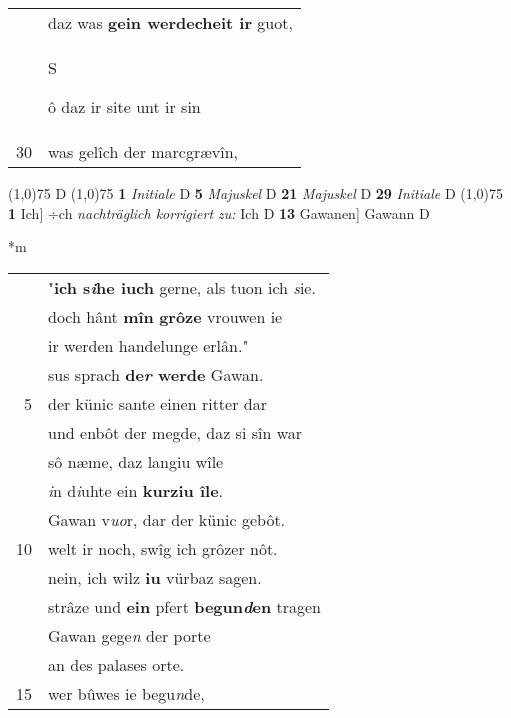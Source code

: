 \documentclass[8pt,a4paper,notitlepage]{article}
\begin{document}
\begin{table}[ht]
\begin{minipage}[t]{0.5\linewidth}
\begin{tabular}{rl}
 & daz was \textbf{gein werdecheit ir} guot,\\ 
 & \begin{large}S\end{large}ô daz ir site unt ir sin\\ 
30 & was gelîch der marcgrævîn,\\ 
\end{tabular}
\scriptsize
\line(1,0){75} \newline
D \newline
\line(1,0){75} \newline
\textbf{1} \textit{Initiale} D  \textbf{5} \textit{Majuskel} D  \textbf{21} \textit{Majuskel} D  \textbf{29} \textit{Initiale} D  \newline
\line(1,0){75} \newline
\textbf{1} Ich] ÷ch \textit{nachträglich korrigiert zu:} Ich D \textbf{13} Gawanen] Gawann D \newline
\end{minipage}
\hspace{0.5cm}
\begin{minipage}[t]{0.5\linewidth}
\small
\begin{center}*m
\end{center}
\begin{tabular}{rl}
 & "\textbf{ich s\textit{i}he iuch} gerne, als tuon ich \textit{s}ie.\\ 
 & doch hânt \textbf{mîn} \textbf{grôze} vrouwen ie\\ 
 & ir werden handelunge erlân."\\ 
 & sus sprach \textbf{de\textit{r} werde} Gawan.\\ 
5 & der künic sante einen ritter dar\\ 
 & und enbôt der megde, daz si sîn war\\ 
 & sô næme, daz langiu wîle\\ 
 & \textit{i}n d\textit{i}uhte ein \textbf{kurziu île}.\\ 
 & Gawan v\textit{uo}r, dar der künic gebôt.\\ 
10 & welt ir noch, swîg ich grôzer nôt.\\ 
 & nein, ich wilz \textbf{iu} vürbaz sagen.\\ 
 & strâze und \textbf{ein} pfert \textbf{begun\textit{d}en} tragen\\ 
 & Gawan gege\textit{n} der porte\\ 
 & an des palases orte.\\ 
15 & wer bûwes ie begu\textit{n}de,\\ 

\end{tabular}
\end{minipage}
\end{table}
\end{document}
